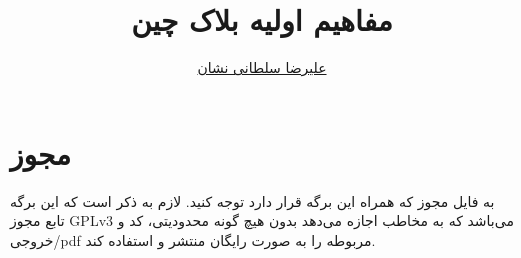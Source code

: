 \documentclass[10pt, a4paper]{article}
\title{مفاهیم اولیه بلاک چین}
\author{\href{mailto:a.soltani@iau-tnb.ac.ir}{علیرضا سلطانی نشان}}
\begin{document}
\maketitle
\tableofcontents

\section{مجوز}

به فایل مجوز که همراه این برگه قرار دارد توجه کنید. لازم به ذکر است که این برگه
تابع مجوز GPLv3 می‌باشد که به مخاطب اجازه می‌دهد بدون هیچ گونه محدودیتی، کد و
خروجی/pdf مربوطه را به صورت رایگان منتشر و استفاده کند.
\end{document}

